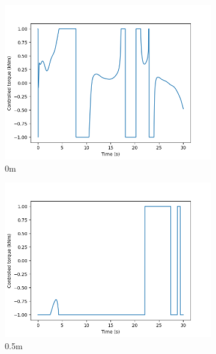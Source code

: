 \documentclass[class=article, crop=false]{standalone}
\begin{document}
\begin{figure}
    \centering
    \begin{subfigure}[b]{0.48\textwidth}
        \centering
        \includegraphics{scenario1/rov-100m/0.0m/usv_torque}
        \caption{0m}
        \label{}
    \end{subfigure}
    \hfill
    \begin{subfigure}[b]{0.48\textwidth}
        \centering
        \includegraphics{scenario1/rov-100m/0.5m/usv_torque}
        \caption{0.5m}
        \label{}
    \end{subfigure}
    \vfill
    \begin{subfigure}[b]{0.48\textwidth}
        \centering

\end{subfigure}
\end{figure}
\end{document}
